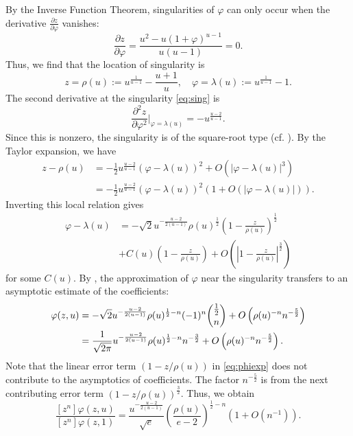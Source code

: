 \documentclass[11pt,letterpaper]{amsart}
\numberwithin{equation}{section}
\theoremstyle{definition}
\def\beq{\begin{equation}}
\def\eeq{\end{equation}}
\begin{document}
By the Inverse Function Theorem, singularities of $\varphi$ can only occur when the derivative $ \frac{\partial z}{\partial \varphi}$ vanishes:
\[\frac{\partial z}{\partial \varphi}= \frac{u^2-u(1+\varphi)^{u-1}}{u(u-1)}=0.  \]
Thus, we find that the location of singularity is
\beq\label{eq:sing} z= \rho(u) := u^{\frac{1}{u-1}}- \frac{u+1}{u}, \hspace{1em} \varphi = \lambda(u):= u^\frac{1}{u-1}-1. \eeq
The second derivative at the singularity \eqref{eq:sing} is
\beq\label{eq:phi''} \frac{\partial^2 z}{\partial \varphi^2}|_{\varphi=\lambda(u)}= - u^{\frac{u-2}{u-1}}.  \eeq
Since this is nonzero, the singularity is of the square-root type (cf. \cite[\S IX.7.3.]{FS}).
By the Taylor expansion, we have
\[
\begin{split}
   z-\rho(u) & =  -\frac12 u^{\frac{u-2}{u-1}} (\varphi - \lambda(u))^2+O\left(|\varphi-\lambda(u)|^3\right) \\
    & = -\frac12 u^{\frac{u-2}{u-1}} (\varphi - \lambda(u))^2\left(1+O\left(|\varphi-\lambda(u)|\right)\right).
\end{split}
 \]
Inverting this local relation gives
\beq \label{eq:phiexp}
\begin{split}
\varphi - \lambda(u) & =  - \sqrt{2} u^{-\frac{u-2}{2(u-1)}} \rho(u)^\frac12 \left(1 - \frac{z}{\rho(u)}\right)^\frac12 \\ &
+ C(u)\left(1 - \frac{z}{\rho(u)}\right)+O\left(\left|1 - \frac{z}{\rho(u)}\right|^{\frac{3}{2}}\right)
\end{split}
\eeq
for some $C(u)$. By \cite[Theorem VI.4]{FS}, the approximation of $\varphi$ near the singularity transfers to an asymptotic estimate of the coefficients:
\begin{align}
  [z^n]\varphi(z, u)  & = -\sqrt{2} u^{-\frac{u-2}{2(u-1)}} \rho(u)^{\frac12 -n} (-1)^n \binom{\frac{1}{2}}{n} + O\left(\rho(u)^{-n}n^{-\frac{5}{2}}\right)  \notag \\
   & = \frac{1}{\sqrt{2\pi}}u^{-\frac{u-2}{2(u-1)}}\rho(u)^{\frac12 -n} n^{-\frac{3}{2}} + O\left(\rho(u)^{-n}n^{-\frac{5}{2}}\right). \label{eq:varphiasymp}
\end{align}
Note that the linear error term $(1-z/\rho(u))$ in \eqref{eq:phiexp} does not contribute to the asymptotics of coefficients. The factor $n^{-\frac{5}{2}}$ is from the next contributing error term $(1-z/\rho(u))^{\frac{3}{2}}$. Thus, we obtain
\beq\label{eq:asym}
\frac{[z^n]\varphi(z, u)}{[z^n]\varphi(z, 1)}   = \frac{u^{-\frac{u-2}{2(u-1)}}}{\sqrt{e}}\left(\frac{\rho(u)}{e-2}\right)^{\frac12-n}\left( 1 + O\left(n^{-1}\right)\right).
\eeq
\end{document}
